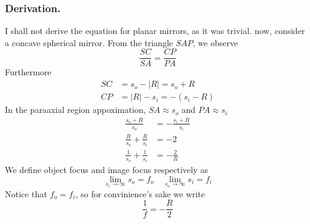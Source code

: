 \documentclass[../../../main.tex]{subfiles}
\begin{document}
\subsubsection*{Derivation.}
I shall not derive the equation for planar mirrors, as it was trivial. now, consider a concave spherical mirror. From the triangle $SAP$, we observe 
\begin{equation*}
    \frac{SC}{SA}=\frac{CP}{PA}
\end{equation*}
Furthermore
\begin{align*}
    SC&=s_o-|R|=s_o+R\\
    CP&=|R|-s_i=-(s_i-R)
\end{align*}
In the paraaxial region appoximation, $SA\approx s_o$ and $PA\approx s_i$
\begin{align*}
    \frac{s_o+R}{s_o}&=-\frac{s_i+R}{s_i}\\
    \frac{R}{s_o}+\frac{R}{s_i}&=-2\\
    \frac{1}{s_o}+\frac{1}{s_i}&=-\frac{2}{R}
\end{align*}
We define object focus and image focus respectively as 
\begin{equation*}
    \lim_{s_i\rightarrow\infty}s_o=f_o\quad\lim_{s_o\rightarrow\infty}s_i=f_i
\end{equation*}
Notice that $f_o=f_i$, so for convinience's sake we write 
\begin{equation*}
    \frac{1}{f}=-\frac{R}{2}
\end{equation*}
\end{document}

